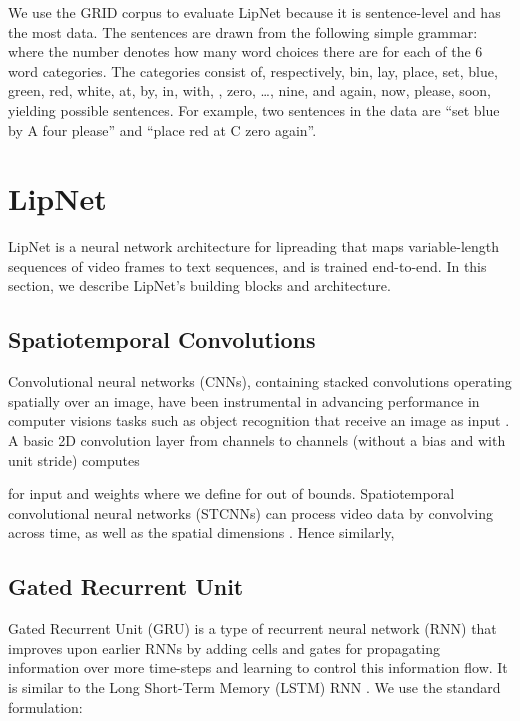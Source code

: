 \documentclass{article}
\begin{document}
We use the GRID corpus to evaluate LipNet because it is sentence-level and has the most data. The sentences are drawn from the following simple grammar:
 where the number denotes how many word choices there are for each of the 6 word categories. The categories consist of, respectively,
bin, lay, place, set, blue, green, red, white, at, by, in, with, , zero, \dots, nine, and again, now, please, soon, yielding  possible sentences.
For example, two sentences in the data are ``set blue by A four please'' and ``place red at C zero again''.
 
\section{LipNet}
\label{sec:model}

LipNet is a neural network architecture for lipreading that maps variable-length sequences of video frames to text sequences, and is trained end-to-end.  In this section, we describe LipNet's building blocks and architecture.

\subsection{Spatiotemporal Convolutions}

Convolutional neural networks (CNNs), containing stacked convolutions operating spatially over an image, have been instrumental in advancing performance in computer visions tasks such as object recognition that receive an image as input \citep{krizhevsky2012imagenet}. A basic 2D convolution layer from  channels to  channels (without a bias and with unit stride) computes

for input  and weights  where we define  for  out of bounds.
Spatiotemporal convolutional neural networks (STCNNs) can process video data by convolving across time, as well as the spatial dimensions \citep{karpathy2014large,ji20133d}. Hence similarly,


\subsection{Gated Recurrent Unit}
\label{sec:lstm}

Gated Recurrent Unit (GRU) \citep{chung2014empirical} is a type of recurrent neural network (RNN) that improves upon earlier RNNs by adding cells and gates for propagating information over more time-steps and learning to control this information flow. It is similar to the Long Short-Term Memory (LSTM) RNN \citep{hochreiter1997long}.
We use the standard formulation:
\end{document}
